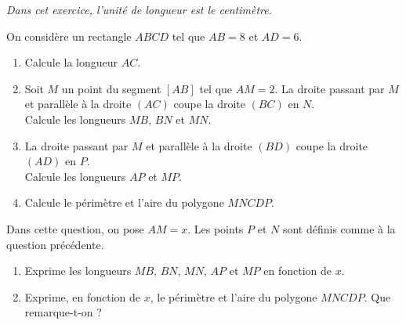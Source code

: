 {\em Dans cet exercice, l'unité de longueur est le centimètre.}
\par On considère un rectangle $ABCD$ tel que $AB=8$ et $AD=6$.
\begin{myenumerate}
\item
\begin{enumerate}
\item Calcule la longueur $AC$.
\item Soit $M$ un point du segment $[AB]$ tel que $AM=2$. La droite
passant par $M$ et parallèle à la droite $(AC)$ coupe la droite $(BC)$
en $N$.\\ Calcule les longueurs $MB$, $BN$ et $MN$.
\item La droite passant par $M$ et parallèle à la droite $(BD)$ coupe
la droite $(AD)$ en $P$.\\ Calcule les longueurs $AP$ et $MP$.
\item Calcule le périmètre et l'aire du polygone $MNCDP$.
\end{enumerate}
\item Dans cette question, on pose $AM=x$. Les points $P$ et $N$ sont
définis comme à la question précédente.
\begin{enumerate}
\item Exprime les longueurs $MB$, $BN$, $MN$, $AP$ et $MP$ en fonction
de $x$.
\item Exprime, en fonction de $x$, le périmètre et l'aire du polygone
$MNCDP$. Que remarque-t-on ?
\end{enumerate}
\end{myenumerate}